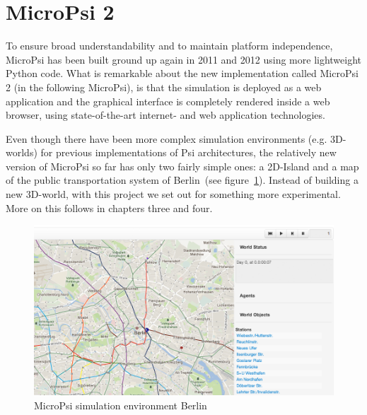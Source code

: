     \section{MicroPsi 2}
To ensure broad understandability and to maintain platform independence, MicroPsi has been built ground up again in 2011 and 2012 using more lightweight Python code. What is remarkable about the new implementation called MicroPsi 2 (in the following MicroPsi), is that the simulation is deployed as a web application and the graphical interface is completely rendered inside a web browser, using state-of-the-art internet- and web application technologies.~\cite{conf/agi/Bach12}
        
Even though there have been more complex simulation environments (e.g. 3D-worlds) for previous implementations of Psi architectures, the relatively new version of MicroPsi so far has only two fairly simple ones: a 2D-Island and a map of the public transportation system of Berlin~(see figure~\ref{mp2_berlin}). Instead of building a new 3D-world, with this project we set out for something more experimental. More on this follows in chapters three and four.

\begin{figure}[h]
  \centering
    \includegraphics[width=14cm]{graphics/mp2_berlin}
  \caption{MicroPsi simulation environment Berlin}
  \label{mp2_berlin}
\end{figure}

